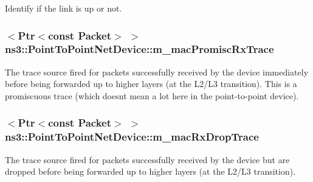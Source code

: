 Identify if the link is up or not. 

\subsubsection[{\texorpdfstring{m\+\_\+mac\+Promisc\+Rx\+Trace}{m_macPromiscRxTrace}}]{$<${\bf Ptr}$<$const {\bf Packet}$>$ $>$ ns3\+::\+Point\+To\+Point\+Net\+Device\+::m\+\_\+mac\+Promisc\+Rx\+Trace\hspace{0.3cm}{\ttfamily [private]}}\hypertarget{classns3_1_1PointToPointNetDevice_a12dd8c413178e96b65bf9d05bedb1c0a}{}\label{classns3_1_1PointToPointNetDevice_a12dd8c413178e96b65bf9d05bedb1c0a}
The trace source fired for packets successfully received by the device immediately before being forwarded up to higher layers (at the L2/\+L3 transition). This is a promiscuous trace (which doesn\textquotesingle{}t mean a lot here in the point-\/to-\/point device). 
\subsubsection[{\texorpdfstring{m\+\_\+mac\+Rx\+Drop\+Trace}{m_macRxDropTrace}}]{$<${\bf Ptr}$<$const {\bf Packet}$>$ $>$ ns3\+::\+Point\+To\+Point\+Net\+Device\+::m\+\_\+mac\+Rx\+Drop\+Trace\hspace{0.3cm}{\ttfamily [private]}}\hypertarget{classns3_1_1PointToPointNetDevice_a1d633e87fb40bb21f4da7cd9c72ac17f}{}\label{classns3_1_1PointToPointNetDevice_a1d633e87fb40bb21f4da7cd9c72ac17f}
The trace source fired for packets successfully received by the device but are dropped before being forwarded up to higher layers (at the L2/\+L3 transition). 

